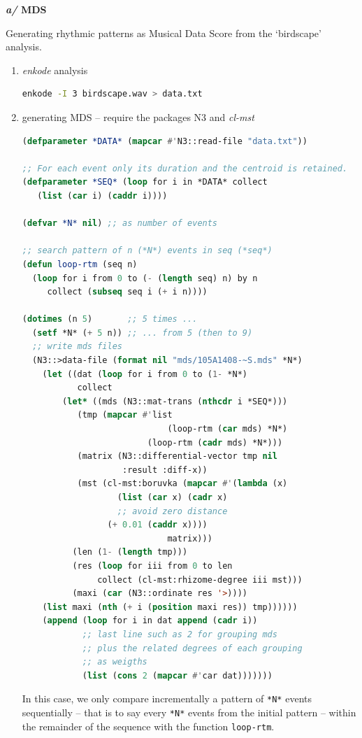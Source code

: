   \textbf{\textit{a/} MDS }
  
  \smallskip
  Generating rhythmic patterns as Musical Data Score from the `birdscape' analysis.
  
 
 \begin{enumerate}
\item \textsl{enkode} analysis
 
\begin{lstlisting}[basicstyle=\footnotesize\ttfamily,language=Bash]
enkode -I 3 birdscape.wav > data.txt
\end{lstlisting}

\item generating MDS -- require the packages N3 and \textsl{cl-mst}

\begin{lstlisting}[basicstyle=\footnotesize\ttfamily,language=Lisp]
(defparameter *DATA* (mapcar #'N3::read-file "data.txt"))

;; For each event only its duration and the centroid is retained.  
(defparameter *SEQ* (loop for i in *DATA* collect 
   (list (car i) (caddr i))))

(defvar *N* nil) ;; as number of events

;; search pattern of n (*N*) events in seq (*seq*)
(defun loop-rtm (seq n)
  (loop for i from 0 to (- (length seq) n) by n 
     collect (subseq seq i (+ i n))))
     
(dotimes (n 5)       ;; 5 times ...
  (setf *N* (+ 5 n)) ;; ... from 5 (then to 9) 
  ;; write mds files
  (N3::>data-file (format nil "mds/105A1408-~S.mds" *N*) 
    (let ((dat (loop for i from 0 to (1- *N*) 
           collect
        (let* ((mds (N3::mat-trans (nthcdr i *SEQ*)))
	       (tmp (mapcar #'list 
	                         (loop-rtm (car mds) *N*) 
		                 (loop-rtm (cadr mds) *N*)))
	       (matrix (N3::differential-vector tmp nil 
				    :result :diff-x))
	       (mst (cl-mst:boruvka (mapcar #'(lambda (x) 
			       (list (car x) (cadr x) 
			       ;; avoid zero distance
				 (+ 0.01 (caddr x)))) 
				             matrix)))
	      (len (1- (length tmp)))
	      (res (loop for iii from 0 to len 
	           collect (cl-mst:rhizome-degree iii mst)))
	      (maxi (car (N3::ordinate res '>))))
    (list maxi (nth (+ i (position maxi res)) tmp))))))
	(append (loop for i in dat append (cadr i))  
	        ;; last line such as 2 for grouping mds
	        ;; plus the related degrees of each grouping
	        ;; as weigths
	        (list (cons 2 (mapcar #'car dat)))))))
\end{lstlisting}

In this case, we only compare incrementally a pattern of \texttt{*N*} events sequentially -- that is to say every  \texttt{*N*} events from the initial pattern -- within the remainder of the sequence with the function \texttt{loop-rtm}. 
\end{enumerate}

